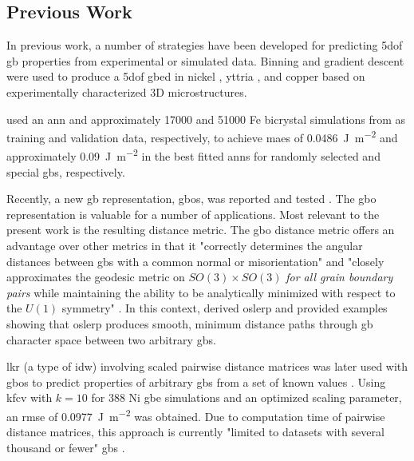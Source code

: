 \documentclass[final,twocolumn,12pt]{elsarticle}
\begin{document}
\subsection{Previous Work}
In previous work, a number of strategies have been developed for predicting \gls{5dof} \gls{gb} properties from experimental or simulated data. Binning and gradient descent were used to produce a \gls{5dof} \gls{gbed} in nickel \cite{liRelativeGrainBoundary2009}, yttria \cite{dillonCharacterizationGrainboundaryCharacter2009}, and copper \cite{randleFiveparameterGrainBoundary2008} based on experimentally characterized 3D microstructures. 

\citet{restrepoUsingArtificialNeural2014} used an \gls{ann} and approximately \num{17000} and \num{51000} Fe bicrystal simulations from \citet{kimIdentificationSchemeGrain2011} as training and validation data, respectively, to achieve \glspl{mae} of \SI{0.0486}{\J\per\square\meter} and approximately \SI{0.09}{\J\per\square\meter} in the best fitted \glspl{ann} for randomly selected and special \glspl{gb}, respectively. 

Recently, a new \gls{gb} representation, \glspl{gbo}, was reported \cite{francisGeodesicOctonionMetric2019} and tested \cite{chesserLearningGrainBoundary2020}. The \gls{gbo} representation is valuable for a number of applications. Most relevant to the present work is the resulting distance metric. The \gls{gbo} distance metric offers an advantage over other metrics in that it "correctly determines the angular distances between \glspl{gb} with a common normal or misorientation" and "closely approximates the geodesic metric on $SO(3) \times SO(3)$ \textit{for all grain boundary pairs} while maintaining the ability to be analytically minimized with respect to the $U(1)$ symmetry" \cite{francisGeodesicOctonionMetric2019}. In this context, \citet{francisGeodesicOctonionMetric2019} derived \gls{oslerp} and provided examples showing that \gls{oslerp} produces smooth, minimum distance paths through \gls{gb} character space between two arbitrary \glspl{gb}. 

\Gls{lkr} (a type of \gls{idw}) involving scaled pairwise distance matrices was later used with \glspl{gbo} to predict properties of arbitrary \glspl{gb} from a set of known values \cite{chesserLearningGrainBoundary2020}. Using \gls{kfcv} with $k=10$ for \num{388} Ni \gls{gbe} simulations \cite{olmstedSurveyComputedGrain2009a} and an optimized scaling parameter, an \gls{rmse} of \SI{0.0977}{\J\per\square\meter} was obtained. Due to computation time of pairwise distance matrices, this approach is currently "limited to datasets with several thousand or fewer" \glspl{gb} \cite{chesserLearningGrainBoundary2020}.
\end{document}
